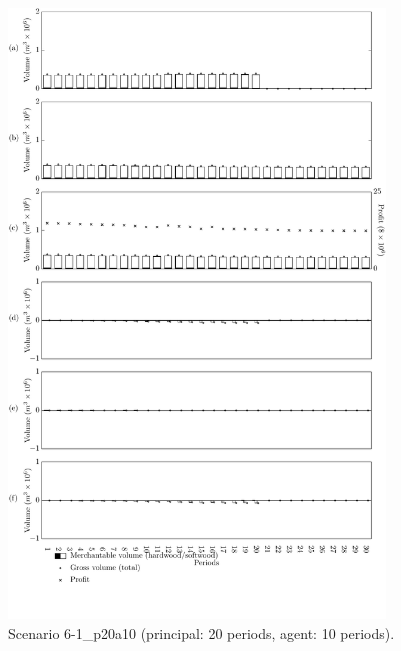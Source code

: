 \begin{figure}[h]
  \centering
  \includegraphics[width=10cm]{images/appendix/s6-1_p20a10}
  \caption{Scenario 6-1\_p20a10 (principal: 20 periods, agent: 10 periods).}
  \label{fig:s6-1_p20a10}
\end{figure}

